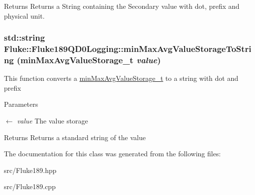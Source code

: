 \label{classFluke_1_1Fluke189QD0Logging_a5e36bbcb7bc5c45ffaf099af76c46d7e}
\begin{DoxyReturn}{Returns}
Returns a String containing the Secondary value with dot, prefix and physical unit. 
\end{DoxyReturn}
\hypertarget{classFluke_1_1Fluke189QD0Logging_a328f1e4b632082f62d461fd4ba6eb838}{
\subsubsection[{minMaxAvgValueStorageToString}]{\setlength{\rightskip}{0pt plus 5cm}std::string Fluke::Fluke189QD0Logging::minMaxAvgValueStorageToString ({\bf minMaxAvgValueStorage\_\-t} {\em value})}}
\label{classFluke_1_1Fluke189QD0Logging_a328f1e4b632082f62d461fd4ba6eb838}
This function converts a \hyperlink{structFluke_1_1Fluke189QD0Logging_1_1minMaxAvgValueStorage__t}{minMaxAvgValueStorage\_\-t} to a string with dot and prefix 
\begin{DoxyParams}{Parameters}
\item[\mbox{$\leftarrow$} {\em value}]The value storage \end{DoxyParams}
\begin{DoxyReturn}{Returns}
Returns a standard string of the value 
\end{DoxyReturn}


The documentation for this class was generated from the following files:\begin{DoxyCompactItemize}
\item 
src/Fluke189.hpp\item 
src/Fluke189.cpp\end{DoxyCompactItemize}
